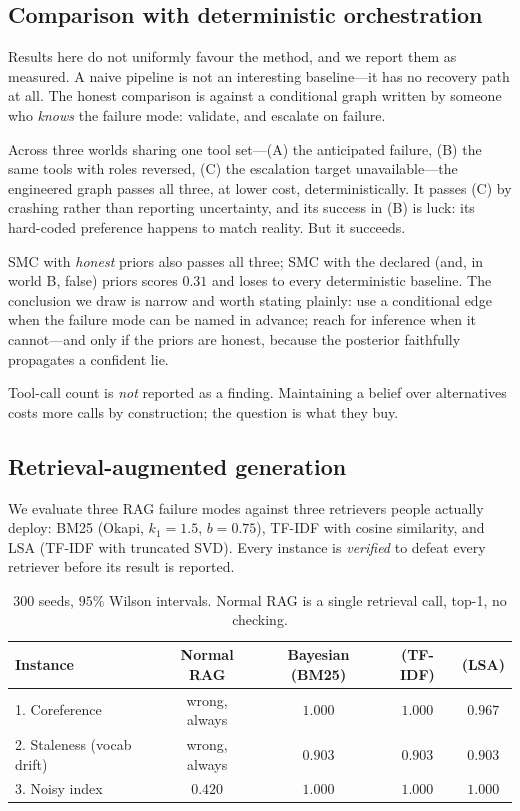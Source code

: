 \documentclass[11pt,a4paper]{article}
\begin{document}
\subsection{Comparison with deterministic orchestration}

Results here do not uniformly favour the method, and we report them as
measured. A naive pipeline is not an interesting baseline---it has no recovery
path at all. The honest comparison is against a conditional graph written by
someone who \emph{knows} the failure mode: validate, and escalate on failure.

Across three worlds sharing one tool set---(A) the anticipated failure, (B) the
same tools with roles reversed, (C) the escalation target unavailable---the
engineered graph passes all three, at lower cost, deterministically. It passes
(C) by crashing rather than reporting uncertainty, and its success in (B) is
luck: its hard-coded preference happens to match reality. But it succeeds.

SMC with \emph{honest} priors also passes all three; SMC with the declared
(and, in world B, false) priors scores $0.31$ and loses to every deterministic
baseline. The conclusion we draw is narrow and worth stating plainly: use a
conditional edge when the failure mode can be named in advance; reach for
inference when it cannot---and only if the priors are honest, because the
posterior faithfully propagates a confident lie.

Tool-call count is \emph{not} reported as a finding. Maintaining a belief over
alternatives costs more calls by construction; the question is what they buy.

\subsection{Retrieval-augmented generation}

We evaluate three RAG failure modes against three retrievers people actually
deploy: BM25 (Okapi, $k_1=1.5$, $b=0.75$), TF-IDF with cosine similarity, and
LSA (TF-IDF with truncated SVD). Every instance is \emph{verified} to defeat
every retriever before its result is reported.

\begin{table}[h]
\centering
\small
\begin{tabular}{@{}lcccc@{}}
\toprule
\textbf{Instance} & \textbf{Normal RAG} & \textbf{Bayesian (BM25)} & \textbf{(TF-IDF)} & \textbf{(LSA)} \\
\midrule
1. Coreference             & wrong, always & $\bm{1.000}$ & $\bm{1.000}$ & $0.967$ \\
2. Staleness (vocab drift) & wrong, always & $\bm{0.903}$ & $\bm{0.903}$ & $\bm{0.903}$ \\
3. Noisy index             & $0.420$       & $\bm{1.000}$ & $\bm{1.000}$ & $\bm{1.000}$ \\
\bottomrule
\end{tabular}
\caption{$300$ seeds, $95\%$ Wilson intervals. Normal RAG is a single
retrieval call, top-1, no checking.}
\end{table}
\end{document}
